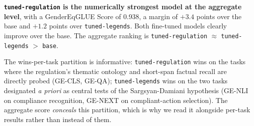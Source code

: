 \documentclass[pdflatex, sn-apa]{sn-jnl}%
\theoremstyle{thmstyleone}%
\theoremstyle{thmstyletwo}%
\theoremstyle{thmstylethree}%
\newcommand{\modelbase}{\texttt{base}}
\newcommand{\modellegends}{\texttt{tuned-legends}}
\newcommand{\modelreg}{\texttt{tuned-regulation}}
\begin{document}
\textbf{\modelreg{} is the numerically strongest model at the aggregate level},
with a GenderEqGLUE Score of 0.938, a margin of $+3.4$ points over the base and
$+1.2$ points over \modellegends. Both fine-tuned models clearly improve over
the base. The aggregate ranking is \modelreg{} $\approx$ \modellegends{} $>$
\modelbase.


The wins-per-task partition is informative: \modelreg{} wins on the tasks where
the regulation's thematic ontology and short-span factual recall are directly
probed (GE-CLS, GE-QA); \modellegends{} wins on the two tasks designated \emph{a
priori} as central tests of the Sargsyan-Damiani hypothesis (GE-NLI on
compliance recognition, GE-NEXT on compliant-action selection). The aggregate
score \emph{conceals} this partition, which is why we read it alongside per-task
results rather than instead of them.



\end{document}
